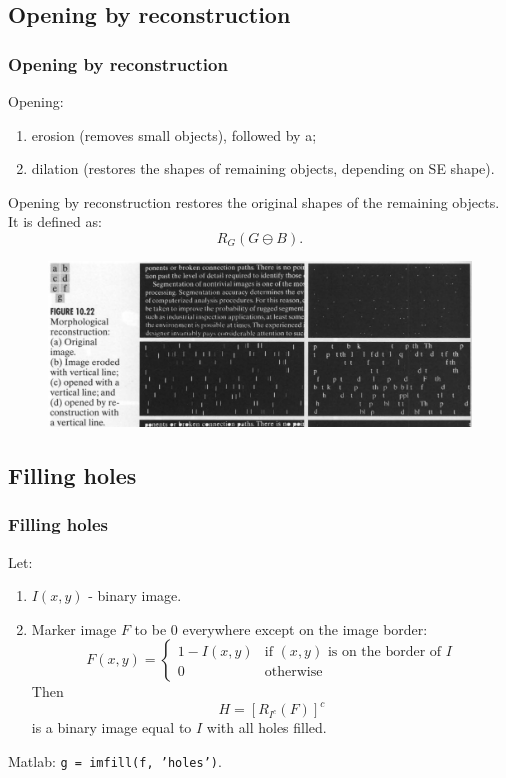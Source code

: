 \subsection{Opening by reconstruction}

\begin{frame}
\frametitle{Opening by reconstruction}
Opening:
\begin{enumerate}
\item erosion (removes small objects), followed by a;
\item dilation (restores the shapes of remaining objects, depending on SE shape).
\end{enumerate}
Opening by reconstruction restores the original shapes of the remaining objects.\\
It is defined as:
\[
R_{G} (G \ominus B).
\]
\end{frame}

\begin{frame}
\begin{figure}[!h]
\includegraphics[width=\textwidth]{fig-10-22}
\end{figure}
\end{frame}

\subsection{Filling holes}

\begin{frame}
\frametitle{Filling holes}
Let:
\begin{enumerate}
\item $I(x,y)$ - binary image.
\item Marker image $F$ to be 0 everywhere except on the image border:
\[
F(x,y) = \left \{
\begin{array}{ll}
1 - I(x,y) & \text{if }(x, y)\text{ is on the border of }I\\
0 & \text{otherwise}
\end{array}
\right .
\]
Then
\[
H = \left [ R_{I^{c}}(F) \right ]^{c}
\]
is a binary image equal to $I$ with all holes filled.
\end{enumerate}
Matlab: \texttt{g = imfill(f, 'holes')}.
\end{frame}
%

